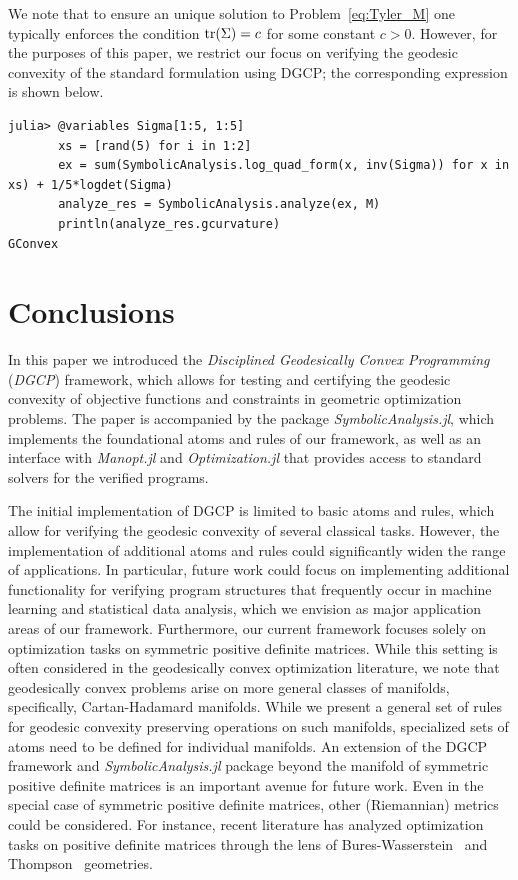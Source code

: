 \documentclass[twoside,11pt]{article}
\begin{document}
 We note that to ensure an unique solution to Problem~\eqref{eq:Tyler_M} one typically enforces the condition $\text{tr} (\Sigma) = c$ for some constant $c > 0$. However, for the purposes of this paper, we restrict our focus on verifying the geodesic convexity of the standard formulation using DGCP; the corresponding expression is shown below.

\begin{listing}[h!]
    \begin{verbatim}
julia> @variables Sigma[1:5, 1:5]
       xs = [rand(5) for i in 1:2]
       ex = sum(SymbolicAnalysis.log_quad_form(x, inv(Sigma)) for x in xs) + 1/5*logdet(Sigma)
       analyze_res = SymbolicAnalysis.analyze(ex, M)
       println(analyze_res.gcurvature)
GConvex
    \end{verbatim}
\end{listing}


\newpage
\section{Conclusions}
In this paper we introduced the \emph{Disciplined Geodesically Convex Programming} (\emph{DGCP}) framework, which allows for testing and certifying the geodesic convexity of objective functions and constraints in geometric optimization problems. The paper is accompanied by the package \textsl{SymbolicAnalysis.jl}, which implements the foundational atoms and rules of our framework, as well as an interface with \textsl{Manopt.jl} and \textsl{Optimization.jl} that provides access to standard solvers for the verified programs.

The initial implementation of DGCP is limited to basic atoms and rules, which allow for verifying the geodesic convexity of several classical tasks. However, the implementation of additional atoms and rules could significantly widen the range of applications. In particular, future work could focus on implementing additional functionality for verifying program structures that frequently occur in machine learning and statistical data analysis, which we envision as major application areas of our framework. Furthermore, our current framework focuses solely on optimization tasks on symmetric positive definite matrices. While this setting is often considered in the geodesically convex optimization literature, we note that geodesically convex problems arise on more general classes of manifolds, specifically, Cartan-Hadamard manifolds. While we present a general set of rules for geodesic convexity preserving operations on such manifolds, specialized sets of atoms need to be defined for individual manifolds. An extension of the DGCP framework and \textsl{SymbolicAnalysis.jl} package beyond the manifold of symmetric positive definite matrices is an important avenue for future work. Even in the special case of symmetric positive definite matrices, other (Riemannian) metrics could be considered. For instance, recent literature has analyzed optimization tasks on positive definite matrices through the lens of Bures-Wasserstein~\citep{chewi2020gradient} and Thompson~\citep{thompson} geometries. 
\end{document}
